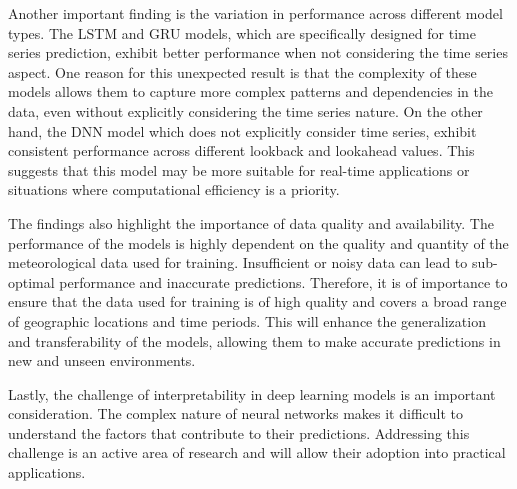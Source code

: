 Another important finding is the variation in performance across different model types. The LSTM and GRU models, which are specifically designed for time series prediction, exhibit better performance when not considering the time series aspect. One reason for this unexpected result is that the complexity of these models allows them to capture more complex patterns and dependencies in the data, even without explicitly considering the time series nature. On the other hand, the DNN model which does not explicitly consider time series, exhibit consistent performance across different lookback and lookahead values. This suggests that this model may be more suitable for real-time applications or situations where computational efficiency is a priority.

The findings also highlight the importance of data quality and availability. The performance of the models is highly dependent on the quality and quantity of the meteorological data used for training. Insufficient or noisy data can lead to sub-optimal performance and inaccurate predictions. Therefore, it is of importance to ensure that the data used for training is of high quality and covers a broad range of geographic locations and time periods. This will enhance the generalization and transferability of the models, allowing them to make accurate predictions in new and unseen environments.

Lastly, the challenge of interpretability in deep learning models is an important consideration. The complex nature of neural networks makes it difficult to understand the factors that contribute to their predictions. Addressing this challenge is an active area of research and will allow their adoption into practical applications.

